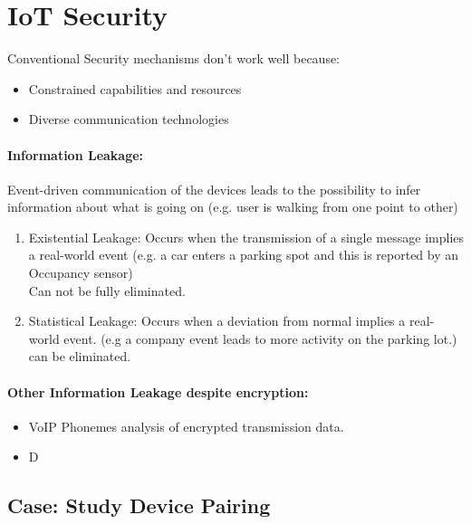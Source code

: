 \section{IoT Security} 
Conventional Security mechanisms don't work well because:
\begin{itemize}
    \item Constrained capabilities and resources
    \item Diverse communication technologies
\end{itemize}{}

\paragraph{Information Leakage: }Event-driven communication of the devices leads to the possibility to infer information about what is going on (e.g. user is walking from one point to other)
\begin{enumerate}
    \item Existential Leakage: Occurs when the transmission of a single message implies a real-world event (e.g. a car enters a parking spot and this is reported by an Occupancy sensor)\\
    Can not be fully eliminated.
    \item Statistical Leakage: Occurs when a deviation from normal implies a real-world event. (e.g a company event leads to more activity on the parking lot.)\\
    can be eliminated.
\end{enumerate}{}

\paragraph{Other Information Leakage despite encryption:}
\begin{itemize}
    \item VoIP Phonemes analysis of encrypted transmission data.
    \item D
\end{itemize}{}

\subsection{Case: Study Device Pairing}